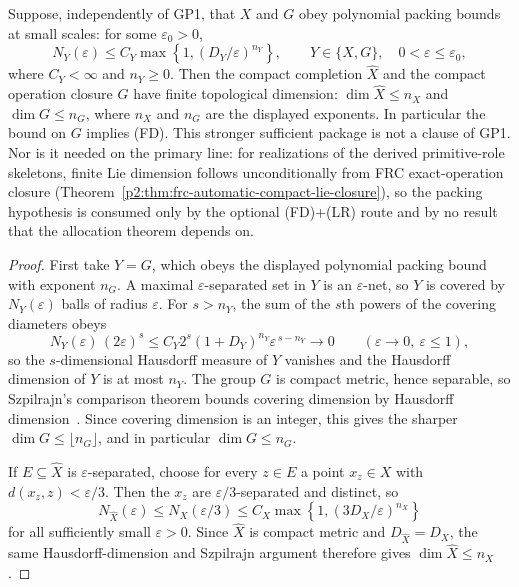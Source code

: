 \documentclass[11pt,a4paper]{article}
\begin{document}
\begin{theorem}
\label{p2:thm:gp1-capacity-finite-dimension}
Suppose, independently of GP1, that \(X\) and \(G\) obey polynomial packing
bounds at small scales: for some \(\varepsilon_0>0\),
\[
 N_Y(\varepsilon)
 \le C_Y\max\left\{1,(D_Y/\varepsilon)^{n_Y}\right\},
 \qquad
 Y\in\{X,G\},\quad 0<\varepsilon\le\varepsilon_0,
\]
where \(C_Y<\infty\) and \(n_Y\ge0\).
Then the compact completion \(\widehat X\) and the compact operation closure
\(G\) have finite topological dimension:
\(\dim\widehat X\le n_X\) and \(\dim G\le n_G\), where \(n_X\) and \(n_G\)
are the displayed exponents.  In particular the bound on \(G\) implies (FD).
This stronger sufficient package is not a clause of GP1.  Nor is it needed on
the primary line: for realizations of the derived primitive-role skeletons,
finite Lie dimension follows
unconditionally from FRC exact-operation closure
(Theorem~\ref{p2:thm:frc-automatic-compact-lie-closure}), so the packing
hypothesis is consumed only by the optional (FD)+(LR) route and by no result
that the allocation theorem depends on.
\end{theorem}

\begin{proof}
First take \(Y=G\), which obeys the displayed polynomial packing bound with
exponent \(n_G\).  A maximal \(\varepsilon\)-separated set in \(Y\) is an
\(\varepsilon\)-net, so \(Y\) is covered by \(N_Y(\varepsilon)\) balls of
radius \(\varepsilon\).  For \(s>n_Y\), the sum of the \(s\)th powers of
the covering diameters obeys
\[
 N_Y(\varepsilon)\,(2\varepsilon)^s
 \le C_Y2^s(1+D_Y)^{n_Y}\varepsilon^{\,s-n_Y}
 \longrightarrow0
 \qquad(\varepsilon\to0,\ \varepsilon\le1),
\]
so the \(s\)-dimensional Hausdorff measure of \(Y\) vanishes and the
Hausdorff dimension of \(Y\) is at most \(n_Y\).  The group \(G\) is compact metric, hence separable, so Szpilrajn's comparison
theorem bounds covering dimension by Hausdorff dimension~\cite{Szpilrajn1937}.
Since covering dimension is an integer, this gives the sharper
\(\dim G\le\lfloor n_G\rfloor\), and in particular \(\dim G\le n_G\).

If \(E\subseteq\widehat X\) is \(\varepsilon\)-separated, choose for every
\(z\in E\) a point \(x_z\in X\) with
\(d(x_z,z)<\varepsilon/3\).  Then the \(x_z\) are
\(\varepsilon/3\)-separated and distinct, so
\[
 N_{\widehat X}(\varepsilon)
 \le N_X(\varepsilon/3)
 \le C_X\max\left\{1,(3D_X/\varepsilon)^{n_X}\right\}
\]
for all sufficiently small \(\varepsilon>0\).
Since \(\widehat X\) is compact metric and \(D_{\widehat X}=D_X\), the same
Hausdorff-dimension and Szpilrajn argument therefore gives
\(\dim\widehat X\le n_X\).
\end{proof}
\end{document}
